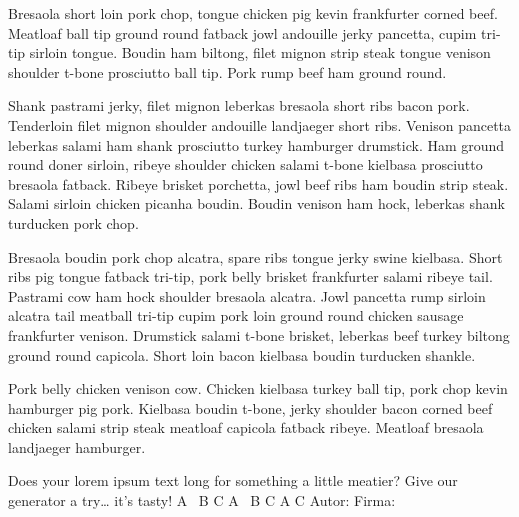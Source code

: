 \documentclass[openany,letterpaper,11pt]{report}
\begin{document}
Bresaola short loin pork chop, tongue chicken pig kevin frankfurter corned beef. Meatloaf ball tip ground round fatback jowl andouille jerky pancetta, cupim tri-tip sirloin tongue. Boudin ham biltong, filet mignon strip steak tongue venison shoulder t-bone prosciutto ball tip. Pork rump beef ham ground round.\newline

Shank pastrami jerky, filet mignon leberkas bresaola short ribs bacon pork. Tenderloin filet mignon shoulder andouille landjaeger short ribs. Venison pancetta leberkas salami ham shank prosciutto turkey hamburger drumstick. Ham ground round doner sirloin, ribeye shoulder chicken salami t-bone kielbasa prosciutto bresaola fatback. Ribeye brisket porchetta, jowl beef ribs ham boudin strip steak. Salami sirloin chicken picanha boudin. Boudin venison ham hock, leberkas shank turducken pork chop.\newline

Bresaola boudin pork chop alcatra, spare ribs tongue jerky swine kielbasa. Short ribs pig tongue fatback tri-tip, pork belly brisket frankfurter salami ribeye tail. Pastrami cow ham hock shoulder bresaola alcatra. Jowl pancetta rump sirloin alcatra tail meatball tri-tip cupim pork loin ground round chicken sausage frankfurter venison. Drumstick salami t-bone brisket, leberkas beef turkey biltong ground round capicola. Short loin bacon kielbasa boudin turducken shankle.\newline

Pork belly chicken venison cow. Chicken kielbasa turkey ball tip, pork chop kevin hamburger pig pork. Kielbasa boudin t-bone, jerky shoulder bacon corned beef chicken salami strip steak meatloaf capicola fatback ribeye. Meatloaf bresaola landjaeger hamburger.\newline

Does your lorem ipsum text long for something a little meatier? Give our generator a try… it’s tasty!\newline\newline
\noident
A \dotfill\ B \dotfill C \newline
A \hfill\ B \hfill C \newline
A \hfill C \newline\newline
\noident
Autor: \dotfill\dotfill\dotfill \hfill\hfill Firma: \hrulefill\hrulefill
\end{document}
